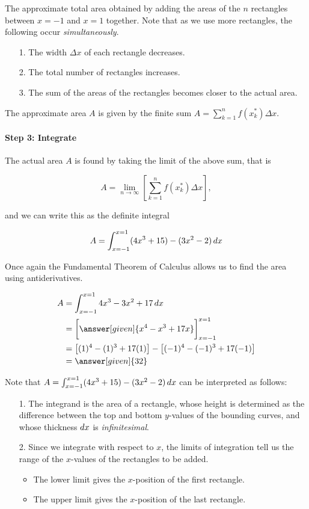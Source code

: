 \documentclass{ximera}
\begin{document}
\begin{model}
The approximate total area obtained by adding the areas of the $n$ rectangles between $x=-1$ and $x=1$ together.  Note that as we use more rectangles, the following occur \emph{simultaneously}.

\begin{itemize}
\item[1.] The width $\Delta x$ of each rectangle decreases.
\item[2.] The total number of rectangles increases.
\item[3.] The sum of the areas of the rectangles becomes closer to the actual area.
\end{itemize}

The approximate area $A$ is given by the finite sum $A = \sum_{k=1}^n f(x_k^*) \Delta x $. 


\paragraph{Step 3: Integrate}

The actual area $A$ is found by taking the limit of the above sum, that is

\[
A = \lim_{n \rightarrow \infty} \left[ \sum_{k=1}^n f(x_k^*) \Delta x \right],
\]

and we can write this as the definite integral

\[
A = \int_{x=-1}^{x=1} (4x^3+15)-(3x^2-2) \mathop{}\!d x
\]

Once again the Fundamental Theorem of Calculus allows us to find the area using antiderivatives.

\begin{align*}
A &= \int_{x=-1}^{x=1} 4x^3-3x^2+17 \d x \\
&= \eval{ \answer[given]{x^4-x^3+17x}}_{x= -1}^{x=1} \\
&= \left[(1)^4-(1)^3+17(1)\right] -  \left[(-1)^4-(-1)^3+17(-1)\right] \\
&=\answer[given]{32}
\end{align*}


Note that $A = \int_{x=-1}^{x=1} (4x^3+15)-(3x^2-2) \mathop{}\!d x$ can be interpreted as follows:
\begin{itemize}
\item[1.] The integrand is the area of a rectangle, whose height is determined as the difference between the top and bottom $y$-values of the bounding curves, and whose thickness $\mathop{}\!d x$ is \emph{infinitesimal}. 
\item[2.] Since we integrate with respect to $x$, the limits of integration tell us the range of the $x$-values of the rectangles to be added.
\begin{itemize}
\item The lower limit gives the $x$-position of the first rectangle.
\item The upper limit gives the $x$-position of the last rectangle.
\end{itemize}
\end{itemize}



\end{model}
\end{document}
